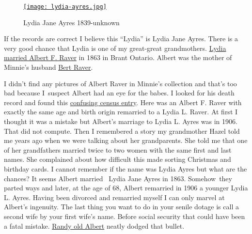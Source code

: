 
\begin{SCfigure}
\centering
\href{http://conceptcontrol.smugmug.com/People/Minnie-Raver/i-FWtqBg4/A}{\texttt{[image: lydia-ayres.jpg]}}
\caption{Lydia Jane Ayres 1839-unknown}
\label{fig:4230X2}
\end{SCfigure}

If the records are correct I believe this ``Lydia'' is Lydia Jane Ayres.
There is a very good chance that Lydia is one of my great-great
grandmothers.
\href{https://familysearch.org/pal:/MM9.1.1/XLPB-DF8}{Lydia married
Albert F. Raver} in 1863 in Brant Ontario. Albert was the mother of
Minnie's husband
\href{https://familysearch.org/pal:/MM9.1.1/F3Q3-45X}{Bert Raver}.

I didn't find any pictures of Albert Raver in Minnie's collection and
that's too bad because I~suspect Albert had an eye for the babes. I
looked for his death record and found this
\href{https://familysearch.org/pal:/MM9.1.1/MVLY-WLB}{confusing census
entry}. Here was an Albert F. Raver with exactly the same age and birth
origin remarried to a Lydia L. Raver. At first I thought it was a
mistake but Albert's marriage to Lydia L. Ayres was in 1906. That did
not compute. Then I remembered a story my grandmother Hazel told me
years ago when we were talking about her grandparents. She told me that
one of her grandfathers married twice to two women with the same first
and last names. She complained about how difficult this made sorting
Christmas and birthday cards. I cannot remember if the name was Lydia
Ayres but what are the chances? It seems Albert married~ Lydia Jane
Ayres in 1863. Somehow~they parted ways and later, at the age of 68,
Albert remarried in 1906 a younger Lydia L. Ayres. Having been divorced
and remarried myself I can only marvel at Albert's ingenuity. The last
thing you want to do in your senile dotage is call a second wife by your
first wife's name. Before social security that could have been a fatal
mistake.
\href{http://www.findagrave.com/cgi-bin/fg.cgi?page=gr\&GRid=89404051}{Randy
old Albert} neatly dodged that bullet.

